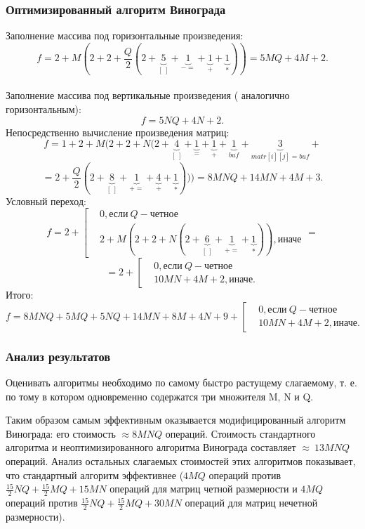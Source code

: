 \documentclass[a4paper,12pt]{article}
\begin{document}
		\subsubsection{Оптимизированный алгоритм Винограда}
		Заполнение массива под горизонтальные произведения:
		\[
			f = 2 + M(2 + 2 + \frac{Q}{2}(2 + \underbrace{5}_{[\:]} + \underbrace{1}_{-=} + \underbrace{1}_{+} + \underbrace{1}_{*})) = 5MQ + 4M + 2.	
		\]
		\\
		Заполнение массива под вертикальные произведения ( аналогично горизонтальным):
		\[
			f = 5NQ + 4N + 2.		
		\]	
				Непосредственно вычисление произведения матриц:
		\[
		f = 1 + 2 + M(2 + 2 + N(2 + \underbrace{4}_{[\:]} + \underbrace{1}_{=} + \underbrace{1}_{+} + \underbrace{1}_{buf} + \underbrace{3}_{matr[i][j] = buf} + 
		\]
		\[
		= 2 + \frac{Q}{2}(2 + \underbrace{8}_{[\:]} + \underbrace{1}_{+=} + \underbrace{4}_{+} + \underbrace{1}_{*}))) = 8MNQ + 14MN + 4M + 3.
		\]
				Условный переход:
		\[
		f = 2 + \left [
		\begin{aligned}
		&0, \text{если}\: Q - \text{четное} \\
		&2 + M(2 + 2 + N(2 + \underbrace{6}_{[\:]} + \underbrace{1}_{+=} + \underbrace{1}_{*})), \text{иначе}
		\end{aligned}
		\right. = \]
		\[ = 2 + \left [
		\begin{aligned}
		&0,  \text{если}\: Q - \text{четное} \\
		&10MN + 4M + 2, \text{иначе}.
		\end{aligned}
		\right. 
		\]
		Итого:
				\[
			f = 8MNQ + 5MQ + 5NQ + 14MN + 8M + 4N + 9 + \left [ \begin{aligned}
		&0, \text{если}\: Q - \text{четное} \\
		&10MN + 4M + 2, \text{иначе}.
		\end{aligned}
		\right.
		\]	
	
	\subsubsection{Анализ результатов}
		Оценивать алгоритмы необходимо по самому быстро растущему слагаемому, т. е. по тому в котором одновременно содержатся  три множителя M, N и Q. 
		
		Таким образом самым эффективным оказывается модифицированный алгоритм Винограда: его стоимость $\approx8MNQ$ операций. Стоимость стандартного алгоритма и неоптимизированного алгоритма Винограда составляет $\approx~13MNQ$ операций. Анализ остальных слагаемых стоимостей этих алгоритмов показывает, что стандартный алгоритм эффективнее ($4MQ$ операций против $\frac{15}{2}NQ + \frac{15}{2}MQ  + 15MN$ операций для матриц четной размерности и $4MQ$ операций против $\frac{15}{2}NQ + \frac{15}{2}MQ  + 30MN$ операций для матриц нечетной размерности).
	
\end{document}
